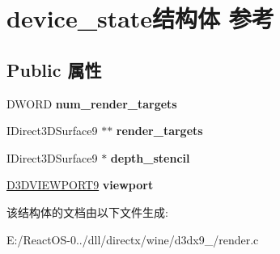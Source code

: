 \hypertarget{structdevice__state}{}\section{device\+\_\+state结构体 参考}
\label{structdevice__state}
\subsection*{Public 属性}
\begin{DoxyCompactItemize}
\item 
\mbox{\label{structdevice__state_ae9c263822ab3dc9e8bac403ff0983163}} 
D\+W\+O\+RD {\bfseries num\+\_\+render\+\_\+targets}
\item 
\mbox{\label{structdevice__state_aed8b2a4da815c2f71ace68541dc2c8e3}} 
I\+Direct3\+D\+Surface9 $\ast$$\ast$ {\bfseries render\+\_\+targets}
\item 
\mbox{\label{structdevice__state_a816dc904c6c27c13498bad09211c705a}} 
I\+Direct3\+D\+Surface9 $\ast$ {\bfseries depth\+\_\+stencil}
\item 
\mbox{\label{structdevice__state_a672e74c1cadf9290dfc1a45dae4a33ec}} 
\hyperlink{struct___d3_d_v_i_e_w_p_o_r_t9}{D3\+D\+V\+I\+E\+W\+P\+O\+R\+T9} {\bfseries viewport}
\end{DoxyCompactItemize}


该结构体的文档由以下文件生成\+:\begin{DoxyCompactItemize}
\item 
E\+:/\+React\+O\+S-\/0../dll/directx/wine/d3dx9\+\_/render.\+c\end{DoxyCompactItemize}
